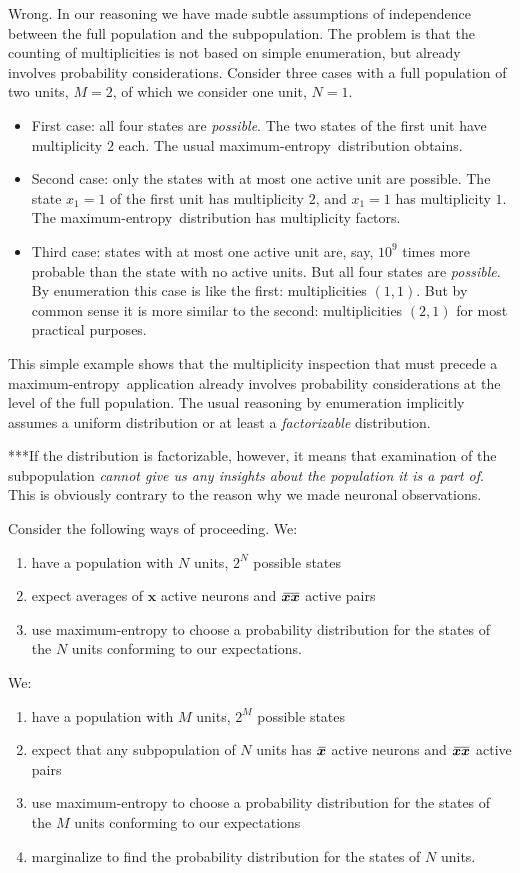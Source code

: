 \documentclass{article}
\theoremstyle{remark}
\theoremstyle{innote}
\renewcommand*{\|}{\mathpunct{|}}%
\theoremstyle{simple}
\newcommand*{\widebar}[1]{{\mkern1.5mu\skew{2}\overline{\mkern-1.5mu#1\mkern-1.5mu}\mkern 1.5mu}}
\newcommand*{\sav}{\widebar} %
\newcommand*{\yxx}{x}%
\newcommand*{\yx}{\bm{\yxx}}%
\newcommand*{\yxs}{\sav{\yx}}%
\newcommand*{\yxxs}{\sav{\yx\yx}}%
\newcommand*{\me}{maximum-entropy}
\begin{document}
Wrong. In our reasoning we have made subtle assumptions of independence
between the full population and the subpopulation. The problem is that the
counting of multiplicities is not based on simple enumeration, but already
involves probability considerations. Consider three cases with a full
population of two units, $M=2$, of which we consider one unit, $N=1$.
\begin{itemize}
\item First case: all four states are \emph{possible}. The two states of
  the first unit have multiplicity $2$ each. The usual \me\ distribution
  obtains.
\item Second case: only the states with at most one active unit are
  possible. The state $\yxx_1=1$ of the first unit has multiplicity
  $2$, and $\yxx_1=1$ has multiplicity $1$. The \me\ distribution has
  multiplicity factors.
\item Third case: states with at most one active unit are, say, $10^{9}$
  times more probable than the state with no active units. But all four
  states are \emph{possible}. By enumeration this case is like the first:
  multiplicities $(1,1)$. But by common sense it is more similar to the
  second: multiplicities $(2,1)$ for most practical purposes.
\end{itemize}

This simple example shows that the multiplicity inspection that must
precede a \me\ application already involves probability considerations at
the level of the full population. The usual reasoning by enumeration
implicitly assumes a uniform distribution or at least a \emph{factorizable}
distribution.

***If the distribution is factorizable, however, it means that examination of
the subpopulation \emph{cannot give us any insights about the population it is a
  part of}. This is obviously contrary to the reason why we made neuronal observations.

Consider the following ways of proceeding. We:
\begin{enumerate}
\item have a population with $N$ units, $2^{N}$ possible states
\item expect averages of $\yx$ active neurons and $\yxxs$ active pairs
\item use maximum-entropy to choose a probability distribution for the
  states of the $N$ units conforming to our expectations.
\end{enumerate}

We:
\begin{enumerate}
\item have a population with $M$ units, $2^{M}$ possible states
\item expect that any subpopulation of $N$ units has $\yxs$ active
  neurons and $\yxxs$ active pairs
\item use maximum-entropy to choose a probability distribution for the
  states of the $M$ units conforming to our expectations
\item marginalize to find the probability distribution for the states of
  $N$ units.
\end{enumerate}
\end{document}
